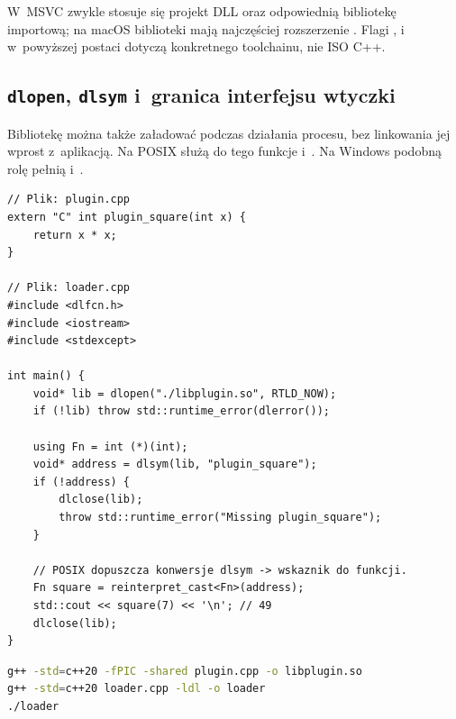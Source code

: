 W~MSVC zwykle stosuje się projekt DLL oraz odpowiednią bibliotekę
importową; na macOS biblioteki mają najczęściej rozszerzenie
. Flagi ,  i~
w~powyższej postaci dotyczą konkretnego toolchainu, nie ISO C++.

\subsection{\texttt{dlopen}, \texttt{dlsym} i~granica interfejsu wtyczki}

Bibliotekę można także załadować podczas działania procesu, bez
linkowania jej wprost z~aplikacją. Na POSIX służą do tego funkcje
 i~. Na Windows podobną rolę pełnią
 i~.

\begin{lstlisting}[caption={Prosta wtyczka C ABI: biblioteka i klient POSIX (dwa pliki).}]
// Plik: plugin.cpp
extern "C" int plugin_square(int x) {
    return x * x;
}

// Plik: loader.cpp
#include <dlfcn.h>
#include <iostream>
#include <stdexcept>

int main() {
    void* lib = dlopen("./libplugin.so", RTLD_NOW);
    if (!lib) throw std::runtime_error(dlerror());

    using Fn = int (*)(int);
    void* address = dlsym(lib, "plugin_square");
    if (!address) {
        dlclose(lib);
        throw std::runtime_error("Missing plugin_square");
    }

    // POSIX dopuszcza konwersje dlsym -> wskaznik do funkcji.
    Fn square = reinterpret_cast<Fn>(address);
    std::cout << square(7) << '\n'; // 49
    dlclose(lib);
}
\end{lstlisting}

\begin{lstlisting}[language=bash,caption={Budowanie przykładu wtyczki (Linux/ELF).}]
g++ -std=c++20 -fPIC -shared plugin.cpp -o libplugin.so
g++ -std=c++20 loader.cpp -ldl -o loader
./loader
\end{lstlisting}


